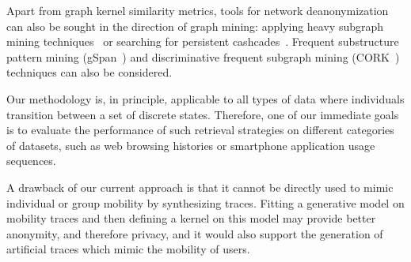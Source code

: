 Apart from graph kernel similarity metrics, tools for network deanonymization can also be sought in the direction of graph mining: applying heavy subgraph mining techniques~\cite{Bogdanov2011} or searching for persistent cashcades~\cite{Morse16}.
Frequent substructure pattern mining (gSpan~\cite{Yan2002}) and discriminative frequent subgraph mining (CORK~\cite{Thoma2010}) techniques can also be considered.

Our methodology is, in principle, applicable to all types of data where individuals transition between a set of discrete states.
Therefore, one of our immediate goals is to evaluate the performance of such retrieval strategies on different categories of datasets, such as web browsing histories or smartphone application usage sequences.

A drawback of our current approach is that it cannot be directly used to mimic individual or group mobility by synthesizing traces.
Fitting a generative model on mobility traces and then defining a kernel on this model may provide better anonymity, and therefore privacy, and it would also support the generation of artificial traces which mimic the mobility of users.
